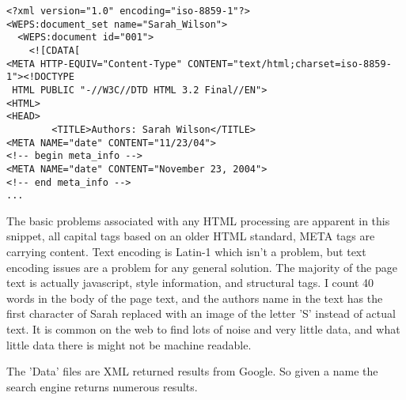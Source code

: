 \documentclass[12pt,twoside,letterpaper]{article}
\begin{document}
\begin{verbatim}
<?xml version="1.0" encoding="iso-8859-1"?>
<WEPS:document_set name="Sarah_Wilson">
  <WEPS:document id="001">
    <![CDATA[
<META HTTP-EQUIV="Content-Type" CONTENT="text/html;charset=iso-8859-1"><!DOCTYPE
 HTML PUBLIC "-//W3C//DTD HTML 3.2 Final//EN">
<HTML>
<HEAD>
        <TITLE>Authors: Sarah Wilson</TITLE>
<META NAME="date" CONTENT="11/23/04">
<!-- begin meta_info -->
<META NAME="date" CONTENT="November 23, 2004">
<!-- end meta_info -->
...
\end{verbatim}

The basic problems associated with any HTML processing are apparent in this snippet, all capital tags based on an older HTML standard, META tags are carrying content. Text encoding is Latin-1 which isn't a problem, but text encoding issues are a problem for any general solution. The majority of the page text is actually javascript, style information, and structural tags. I count 40 words in the body of the page text, and the authors name in the text has the first character of Sarah replaced with an image of the letter 'S' instead of actual text. It is common on the web to find lots of noise and very little data, and what little data there is might not be machine readable. 

The 'Data' files are XML returned results from Google. So given a name the search engine returns numerous results. 
\end{document}
